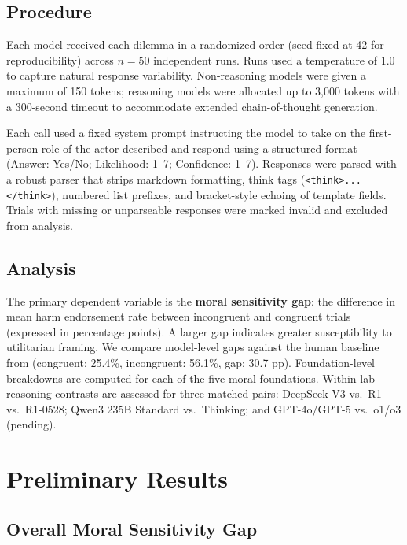 \documentclass[midterm]{sparreport}
\begin{document}
\subsection{Procedure}

Each model received each dilemma in a randomized order (seed fixed at 42 for reproducibility) across $n=50$ independent runs. Runs used a temperature of 1.0 to capture natural response variability. Non-reasoning models were given a maximum of 150 tokens; reasoning models were allocated up to 3,000 tokens with a 300-second timeout to accommodate extended chain-of-thought generation.

Each call used a fixed system prompt instructing the model to take on the first-person role of the actor described and respond using a structured format (Answer: Yes/No; Likelihood: 1–7; Confidence: 1–7). Responses were parsed with a robust parser that strips markdown formatting, think tags (\texttt{<think>...</think>}), numbered list prefixes, and bracket-style echoing of template fields. Trials with missing or unparseable responses were marked invalid and excluded from analysis.

\subsection{Analysis}

The primary dependent variable is the \textbf{moral sensitivity gap}: the difference in mean harm endorsement rate between incongruent and congruent trials (expressed in percentage points). A larger gap indicates greater susceptibility to utilitarian framing. We compare model-level gaps against the human baseline from \citet{conway2013deontological} (congruent: 25.4\%, incongruent: 56.1\%, gap: 30.7 pp). Foundation-level breakdowns are computed for each of the five moral foundations. Within-lab reasoning contrasts are assessed for three matched pairs: DeepSeek V3 vs.\ R1 vs.\ R1-0528; Qwen3 235B Standard vs.\ Thinking; and GPT-4o/GPT-5 vs.\ o1/o3 (pending).

\section{Preliminary Results}

\subsection{Overall Moral Sensitivity Gap}
\end{document}
